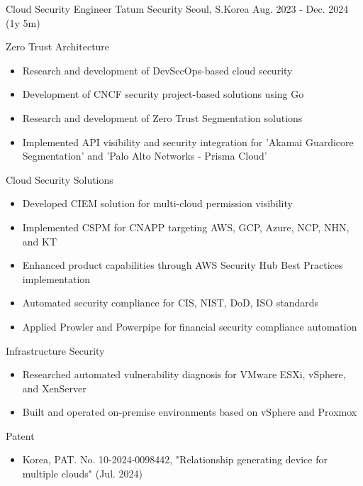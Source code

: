 \begin{cventries}
\cventry
    {Cloud Security Engineer} %
    {Tatum Security} %
    {Seoul, S.Korea} %
    {Aug. 2023 - Dec. 2024 (1y 5m)} %
    {
      \begin{cvitems}
        \item {Zero Trust Architecture}
        \begin{itemize}
          \item {Research and development of DevSecOps-based cloud security}
          \item {Development of CNCF security project-based solutions using Go}
          \item {Research and development of Zero Trust Segmentation solutions}
          \item {Implemented API visibility and security integration for 'Akamai Guardicore Segmentation' and 'Palo Alto Networks - Prisma Cloud'}
        \end{itemize}
        \item {Cloud Security Solutions}
        \begin{itemize}
          \item {Developed CIEM solution for multi-cloud permission visibility}
          \item {Implemented CSPM for CNAPP targeting AWS, GCP, Azure, NCP, NHN, and KT}
          \item {Enhanced product capabilities through AWS Security Hub Best Practices implementation}
          \item {Automated security compliance for CIS, NIST, DoD, ISO standards}
          \item {Applied Prowler and Powerpipe for financial security compliance automation}
        \end{itemize}
        \item {Infrastructure Security}
        \begin{itemize}
          \item {Researched automated vulnerability diagnosis for VMware ESXi, vSphere, and XenServer}
          \item {Built and operated on-premise environments based on vSphere and Proxmox}
        \end{itemize}
        \item {Patent}
        \begin{itemize}
          \item {Korea, PAT. No. 10-2024-0098442, "Relationship generating device for multiple clouds" (Jul. 2024)}
        \end{itemize}
      \end{cvitems}
    }


\end{cventries}

